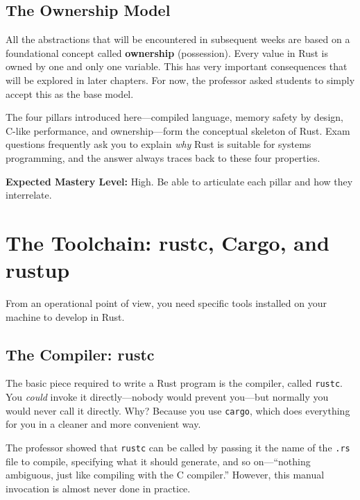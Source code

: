 \subsection{The Ownership Model}

All the abstractions that will be encountered in subsequent weeks are based on a foundational concept called \textbf{ownership} (possession). Every value in Rust is owned by one and only one variable. This has very important consequences that will be explored in later chapters. For now, the professor asked students to simply accept this as the base model.

\begin{examprioritybox}
The four pillars introduced here---compiled language, memory safety by design, C-like performance, and ownership---form the conceptual skeleton of Rust. Exam questions frequently ask you to explain \emph{why} Rust is suitable for systems programming, and the answer always traces back to these four properties.

\textbf{Expected Mastery Level:} High. Be able to articulate each pillar and how they interrelate.
\end{examprioritybox}

\section{The Toolchain: rustc, Cargo, and rustup}

From an operational point of view, you need specific tools installed on your machine to develop in Rust.

\subsection{The Compiler: rustc}

The basic piece required to write a Rust program is the compiler, called \texttt{rustc}. You \emph{could} invoke it directly---nobody would prevent you---but normally you would never call it directly. Why? Because you use \texttt{cargo}, which does everything for you in a cleaner and more convenient way.

The professor showed that \texttt{rustc} can be called by passing it the name of the \texttt{.rs} file to compile, specifying what it should generate, and so on---``nothing ambiguous, just like compiling with the C compiler.'' However, this manual invocation is almost never done in practice.

